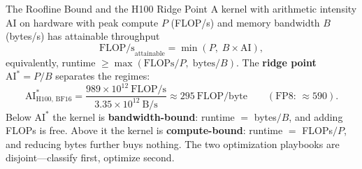 \begin{mathresult}{The Roofline Bound and the H100 Ridge Point}
A kernel with arithmetic intensity $\text{AI}$ on hardware with peak compute $P$ (FLOP/s) and memory bandwidth $B$ (bytes/s) has attainable throughput
\begin{equation}
\text{FLOP/s}_{\text{attainable}} = \min\left(P,\; B \times \text{AI}\right),
\end{equation}
equivalently, runtime $\geq \max\left(\text{FLOPs}/P,\; \text{bytes}/B\right)$. The \textbf{ridge point} $\text{AI}^{*} = P/B$ separates the regimes:
\begin{equation}
\text{AI}^{*}_{\text{H100, BF16}} = \frac{989 \times 10^{12}\ \text{FLOP/s}}{3.35 \times 10^{12}\ \text{B/s}} \approx 295\ \text{FLOP/byte} \qquad (\text{FP8: } \approx 590).
\end{equation}
Below $\text{AI}^{*}$ the kernel is \textbf{bandwidth-bound}: runtime $=$ bytes$/B$, and adding FLOPs is free. Above it the kernel is \textbf{compute-bound}: runtime $=$ FLOPs$/P$, and reducing bytes further buys nothing. The two optimization playbooks are disjoint---classify first, optimize second.
\end{mathresult}

